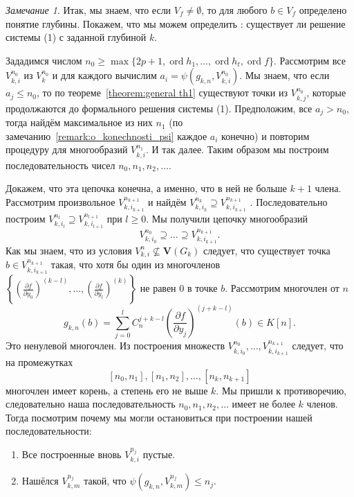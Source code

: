\documentclass[16pt]{article}
\DeclareMathOperator{\ord}{ord}
\renewcommand{\le}{\leqslant} %
\renewcommand{\ge}{\geqslant} %
\theoremstyle{plain1}
\theoremstyle{plain2}
\theoremstyle{plain}
\theoremstyle{plain3}
\theoremstyle{definition}
\theoremstyle{remark}
\newtheorem{remark}[theorem1]{Замечание}
\begin{document}
\begin{remark}\label{remark:o_syshestvovvanii reshenia c zadannoi glubinoi}
Итак, мы знаем, что если ${V}_f\neq\emptyset$, то для любого $b\in {V}_f$ определено понятие глубины. Покажем, что мы можем определить : существует ли решение системы (1) с заданной глубиной $k$.

Зададимся числом $n_0\ge\max\{ 2p+1,\ord{h_1},\ldots,\ord{h_t},\ord{f}\}$. Рассмотрим все ${V}_{k,i}^{n_0}$ из $V_k^{n_0}$  и для каждого вычислим $a_i=\psi(g_{k,n}, {V}_{k,i}^{n_0})$. Мы знаем, что если $a_j\le n_0$, то по теореме~\ref{theorem:general th1} существуют точки из ${V}_{k,j}^{n_0}$, которые продолжаются до формального решения системы (1). Предположим, все $a_j>n_0$, тогда найдём максимальное из них $n_1$ (по замечанию~\ref{remark:o_konechnosti_psi} каждое $a_i$ конечно) и повторим процедуру для многообразий ${V}_{k,i}^{n_1}$. И так далее. Таким образом мы построим последовательность чисел $n_0,n_1,n_2,\ldots$.

Докажем, что эта цепочка конечна, а именно, что в ней не больше $k+1$ члена. Рассмотрим произвольное ${V}_{k,i_{k+1}}^{n_{k+1}}$  и найдём ${V}_{k,i_{k}}^{n_{k}}\supseteq {V}_{k,i_{k+1}}^{n_{k+1}}$ . Последовательно построим ${V}_{k,i_{l}}^{n_{l}}\supseteq {V}_{k,i_{l+1}}^{n_{l+1}}$ при $l\ge 0$. Мы получили цепочку многообразий
$$
{V}_{k,i_{0}}^{n_{0}}\supseteq\ldots\supseteq {V}_{k,i_{k+1}}^{n_{k+1}}.
$$
   Как мы знаем, что из условия ${V}_{k,i}^n \not\subseteq \mathbf{V}(G_k)$ следует, что существует точка $b\in {V}_{k,i_{k+1}}^{n_{k+1}}$ такая, что хотя бы один из многочленов $\left\{\left(\frac{\partial f}{\partial y_0}\right)^{(k-l)},\ldots, \left(\frac{\partial f}{\partial y_l}\right)^{(k)} \right\}$ не равен 0 в точке $b$.
Рассмотрим многочлен от $n$
$$
g_{k,n}(b)=\sum\limits_{j=0}^{l}C_n^{j+k - l }\left(\frac{\partial f}{\partial y_j}\right)^{(j+k - l)}(b)\in K[n].
$$
Это ненулевой многочлен. Из построения множеств ${V}_{k,i_{0}}^{n_{0}},\ldots, {V}_{k,i_{k+1}}^{n_{k+1}}$ следует, что на промежутках $$[n_0,n_1],[n_1,n_2],\ldots,[n_k,n_{k+1}]$$
многочлен имеет корень, а степень его не выше $k$. Мы пришли к противоречию, следовательно наша последовательность  $n_0,n_1,n_2,\ldots$ имеет не более $k$ членов. Тогда посмотрим почему мы могли остановиться при построении нашей последовательности:

\begin{enumerate}
  \item Все построенные вновь ${V}_{k,i}^{n_j}$ пустые.
  \item Нашёлся ${V}_{k,m}^{n_j}$ такой, что $ \psi(g_{k,n},{V}_{k,m}^{n_j})\le n_j$.
\end{enumerate}


\end{remark}
\end{document}
